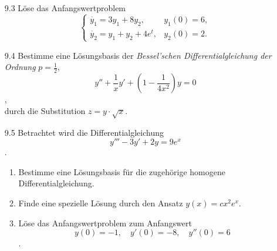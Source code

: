 \documentclass{../HM}
\begin{document}
\begin{enumerate}
		\item [9.3] Löse das Anfangswertproblem
		$$\begin{cases}
			\dot{y_1}=3y_1+8y_2,&y_1(0)=6,\\
			\dot{y_2}=y_1+y_2+4e^t,&y_2(0)=2.
		\end{cases}$$
		
		\item [9.4] Bestimme eine Lösungsbasis der \textit{Bessel'schen Differentialgleichung der Ordnung} $p=\frac{1}{2}$,
		$$y''+\frac{1}{x}y'+(1-\frac{1}{4x^2})y=0$$,\\
		durch die Substitution $z=y\cdot\sqrt{x}$.
		
		\item [9.5] Betrachtet wird die Differentialgleichung
		$$y'''-3y'+2y=9e^x$$.\\
		\begin{enumerate}
			\item Bestimme eine Lösungsbasis für die zugehörige homogene Differentialgleichung.
			
			\item Finde eine spezielle Lösung durch den Ansatz $y(x)=cx^2e^x$.
			
			\item Löse das Anfangswertproblem zum Anfangswert
			$$y(0)=-1,\quad y'(0)=-8,\quad y''(0)=6$$.
		\end{enumerate}
	\end{enumerate}
\end{document}
